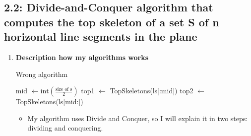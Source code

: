 \documentclass{article}
\begin{document}
	\subsection*{2.2: Divide-and-Conquer algorithm that computes the top skeleton of a set S of n horizontal line
	segments in the plane}
	\begin{enumerate}[label = \alph*]
		\item \textbf{Description how my algorithms works}
		\begin{algorithm}[H]
			\caption{Wrong algorithm}
		\begin{algorithmic}[1]
				\State mid \(\leftarrow \text{int}(\frac{\text{size of s}}{2})\) 
				\State top1 \(\leftarrow\) TopSkeletons(ls[:mid])
				\State top2 \(\leftarrow\) TopSkeletons(ls[mid:])
				\State {} 
			\Else{}
				\State {} 
			\EndIf{}
			\EndFunction{}
		\end{algorithmic}
		\end{algorithm}
		\begin{itemize}
			\item My algorithm uses Divide and Conquer, so I will explain it in two steps: dividing and conquering.
			

\end{itemize}
\end{enumerate}
\end{document}
